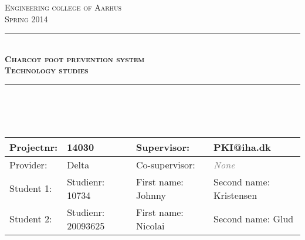 \newcommand{\HRule}{\rule{\linewidth}{0.5mm}} %

\begin{center} %
 

\textsc{\LARGE Engineering college of Aarhus}\\[1.5cm] %
\textsc{\large Spring 2014}\\[0.5cm] %


\HRule \\[0.4cm]
{ \Large \bfseries \textsc{Charcot foot prevention system}}\\[0.4cm] %
{ \huge \bfseries \textsc{Technology studies}} %
\HRule \\[1.5cm]
\ \\
\ \\
\vfill
\begin{table}[H]
\centering
    \begin{tabular}{|l|l|l|p{4cm}|}
    \hline
    Projectnr:   & 14030                                                       & Supervisor:             & PKI@iha.dk              \\ \hline
    Provider:    & Delta                                                       & Co-supervisor:          & \textcolor{gray}{\textit{None}}           \\ \hline
    Student  1:  & Studienr: 10734                                             & First name: Johnny      & Second name: Kristensen \\ \hline
    Student  2:  & Studienr: 20093625                                          & First name: Nicolai     & Second name: Glud       \\ \hline
    \end{tabular}


\end{table}
\end{center}
